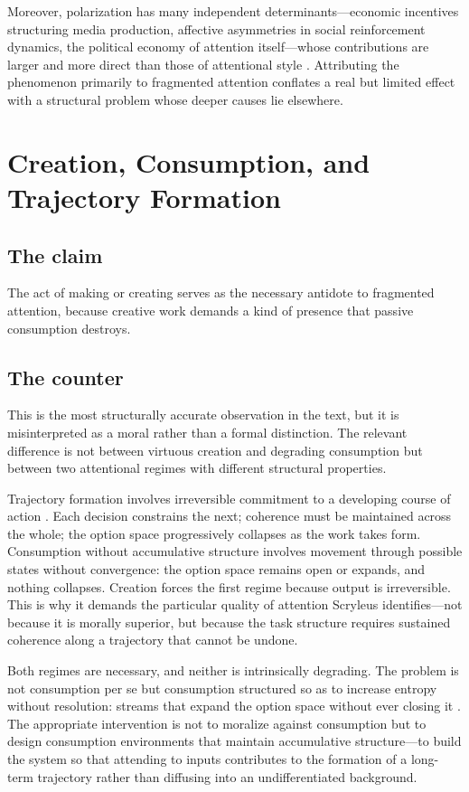 \documentclass[12pt, a4paper]{article}
\begin{document}
Moreover, polarization has many independent determinants---economic incentives structuring media production, affective asymmetries in social reinforcement dynamics, the political economy of attention itself---whose contributions are larger and more direct than those of attentional style \cite{Zuboff2019}. Attributing the phenomenon primarily to fragmented attention conflates a real but limited effect with a structural problem whose deeper causes lie elsewhere.

\section{Creation, Consumption, and Trajectory Formation}

\subsection{The claim}
The act of making or creating serves as the necessary antidote to fragmented attention, because creative work demands a kind of presence that passive consumption destroys.

\subsection{The counter}
This is the most structurally accurate observation in the text, but it is misinterpreted as a moral rather than a formal distinction. The relevant difference is not between virtuous creation and degrading consumption but between two attentional regimes with different structural properties.

Trajectory formation involves irreversible commitment to a developing course of action \cite{Landauer1961}. Each decision constrains the next; coherence must be maintained across the whole; the option space progressively collapses as the work takes form. Consumption without accumulative structure involves movement through possible states without convergence: the option space remains open or expands, and nothing collapses. Creation forces the first regime because output is irreversible. This is why it demands the particular quality of attention Scryleus identifies---not because it is morally superior, but because the task structure requires sustained coherence along a trajectory that cannot be undone.

Both regimes are necessary, and neither is intrinsically degrading. The problem is not consumption per se but consumption structured so as to increase entropy without resolution: streams that expand the option space without ever closing it \cite{Jaynes1957}. The appropriate intervention is not to moralize against consumption but to design consumption environments that maintain accumulative structure---to build the system so that attending to inputs contributes to the formation of a long-term trajectory rather than diffusing into an undifferentiated background.
\end{document}
